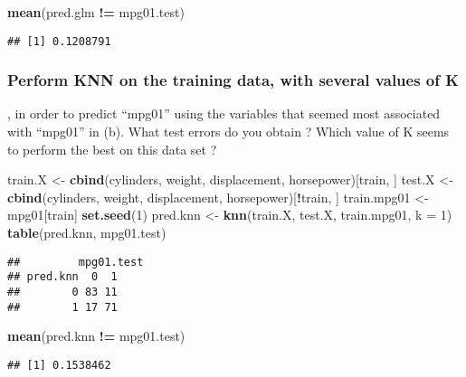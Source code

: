 \documentclass[]{article}
\newenvironment{Shaded}{\begin{snugshade}}{\end{snugshade}}
\newcommand{\KeywordTok}[1]{\textcolor[rgb]{0.13,0.29,0.53}{\textbf{#1}}}
\newcommand{\DataTypeTok}[1]{\textcolor[rgb]{0.13,0.29,0.53}{#1}}
\newcommand{\DecValTok}[1]{\textcolor[rgb]{0.00,0.00,0.81}{#1}}
\newcommand{\StringTok}[1]{\textcolor[rgb]{0.31,0.60,0.02}{#1}}
\newcommand{\OperatorTok}[1]{\textcolor[rgb]{0.81,0.36,0.00}{\textbf{#1}}}
\newcommand{\NormalTok}[1]{#1}
\begin{document}
\begin{Shaded}
\begin{Highlighting}[]
\KeywordTok{mean}\NormalTok{(pred.glm }\OperatorTok{!=}\StringTok{ }\NormalTok{mpg01.test)}
\end{Highlighting}
\end{Shaded}

\begin{verbatim}
## [1] 0.1208791
\end{verbatim}

\subsubsection{Perform KNN on the training data, with several values of
K}\label{perform-knn-on-the-training-data-with-several-values-of-k}

, in order to predict ``mpg01'' using the variables that seemed most
associated with ``mpg01'' in (b). What test errors do you obtain ? Which
value of K seems to perform the best on this data set ?

\begin{Shaded}
\begin{Highlighting}[]
\NormalTok{train.X <-}\StringTok{ }\KeywordTok{cbind}\NormalTok{(cylinders, weight, displacement, horsepower)[train, ]}
\NormalTok{test.X <-}\StringTok{ }\KeywordTok{cbind}\NormalTok{(cylinders, weight, displacement, horsepower)[}\OperatorTok{!}\NormalTok{train, ]}
\NormalTok{train.mpg01 <-}\StringTok{ }\NormalTok{mpg01[train]}
\KeywordTok{set.seed}\NormalTok{(}\DecValTok{1}\NormalTok{)}
\NormalTok{pred.knn <-}\StringTok{ }\KeywordTok{knn}\NormalTok{(train.X, test.X, train.mpg01, }\DataTypeTok{k =} \DecValTok{1}\NormalTok{)}
\KeywordTok{table}\NormalTok{(pred.knn, mpg01.test)}
\end{Highlighting}
\end{Shaded}

\begin{verbatim}
##         mpg01.test
## pred.knn  0  1
##        0 83 11
##        1 17 71
\end{verbatim}

\begin{Shaded}
\begin{Highlighting}[]
\KeywordTok{mean}\NormalTok{(pred.knn }\OperatorTok{!=}\StringTok{ }\NormalTok{mpg01.test)}
\end{Highlighting}
\end{Shaded}

\begin{verbatim}
## [1] 0.1538462
\end{verbatim}
\end{document}
